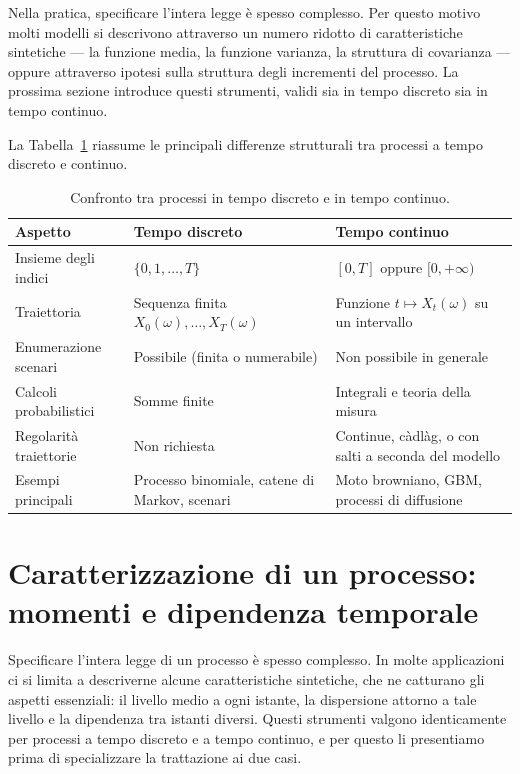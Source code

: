 Nella pratica, specificare l'intera legge \`{e} spesso complesso.
Per questo motivo molti modelli si descrivono attraverso un numero
ridotto di caratteristiche sintetiche --- la funzione media, la
funzione varianza, la struttura di covarianza --- oppure attraverso
ipotesi sulla struttura degli incrementi del processo. La prossima
sezione introduce questi strumenti, validi sia in tempo discreto sia
in tempo continuo.

La Tabella~\ref{tab:discreto-continuo} riassume le principali differenze
strutturali tra processi a tempo discreto e continuo.

\begin{table}[ht]
\centering
\begin{tabular}{|p{2.5cm}|p{4.2cm}|p{4.2cm}|}
\hline
\textbf{Aspetto} & \textbf{Tempo discreto} & \textbf{Tempo continuo}\\
\hline
Insieme \newline degli indici & $\{0,1,\ldots,T\}$ & $[0,T]$ oppure $[0,+\infty)$\\
\hline
Traiettoria & Sequenza finita  \newline 
$X_0(\omega),\ldots,X_T(\omega)$ & Funzione $t\mapsto X_t(\omega)$
su un intervallo\\
\hline
Enumerazione scenari & Possibile (finita o numerabile) &
Non possibile in generale\\
\hline
Calcoli \newline probabilistici & Somme finite & Integrali e teoria della
misura\\
\hline
Regolarit\`{a} \newline traiettorie & Non richiesta & Continue, c\`{a}dl\`{a}g,
o con salti a seconda del modello\\
\hline
Esempi \newline principali & Processo binomiale, catene di Markov,
scenari & Moto browniano, GBM, processi di diffusione\\
\hline
\end{tabular}
\caption{Confronto tra processi in tempo discreto e in tempo continuo.}
\label{tab:discreto-continuo}
\end{table}

\section{Caratterizzazione di un processo: momenti e dipendenza
temporale}
\label{sec:momenti2}

Specificare l'intera legge di un processo \`{e} spesso complesso. In
molte applicazioni ci si limita a descriverne alcune caratteristiche
sintetiche, che ne catturano gli aspetti essenziali: il livello medio
a ogni istante, la dispersione attorno a tale livello e la dipendenza
tra istanti diversi. Questi strumenti valgono identicamente per
processi a tempo discreto e a tempo continuo, e per questo li
presentiamo prima di specializzare la trattazione ai due casi.

